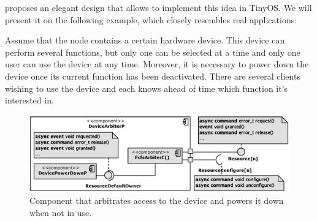 \cite{Klues et al.} proposes an elegant design that allows to
implement this idea in TinyOS. We will present it on the following
example, which closely resembles real applications:

Assume that the node contains a certain hardware device. This
device can perform several functions, but only one can be selected at
a time and only one user can use the device at any time. Moreover, it
is necessary to power down the device once its current function has
been deactivated. There are several clients wishing to use the device
and each knows ahead of time which function it's interested in.
\begin{figure}[h]
  \centering
  \includegraphics[width=1.0\textwidth]{diagrams/devicearbiterp.eps}
  \caption{Component that arbitrates access to the device and powers
  it down when not in use.}
  \label{fig:devicearbiterp}
\end{figure}

